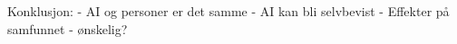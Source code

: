 Konklusjon: 
- AI og personer er det samme
- AI kan bli selvbevist
- Effekter på samfunnet
- ønskelig?
